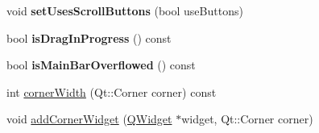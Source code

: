 \begin{DoxyCompactItemize}
\item 
\hypertarget{class_combo_tab_bar_ad2fd8ce2abc792dca03735ff81c5d47e}{
void {\bfseries setUsesScrollButtons} (bool useButtons)}
\label{class_combo_tab_bar_ad2fd8ce2abc792dca03735ff81c5d47e}

\item 
\hypertarget{class_combo_tab_bar_a033143d446119c9145bb4ee04599c057}{
bool {\bfseries isDragInProgress} () const }
\label{class_combo_tab_bar_a033143d446119c9145bb4ee04599c057}

\item 
\hypertarget{class_combo_tab_bar_a3fdc1a1707a2e2b6c46340884fad4065}{
bool {\bfseries isMainBarOverflowed} () const }
\label{class_combo_tab_bar_a3fdc1a1707a2e2b6c46340884fad4065}

\item 
int \hyperlink{class_combo_tab_bar_add04fdbda2e634592d3ba6c0a3083e46}{cornerWidth} (Qt::Corner corner) const 
\item 
void \hyperlink{class_combo_tab_bar_a3371dbfa9365711b28f7440dbd4d36e6}{addCornerWidget} (\hyperlink{class_q_widget}{QWidget} $\ast$widget, Qt::Corner corner)
\end{DoxyCompactItemize}
